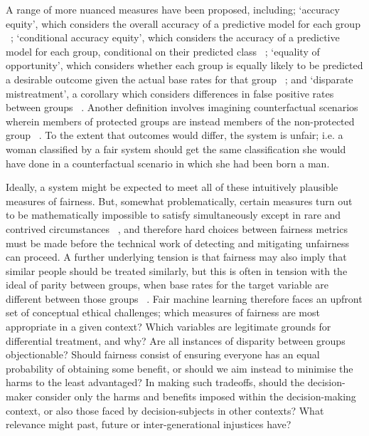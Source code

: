 \documentclass[pmlr,twocolumn,10pt]{jmlr}%
\begin{document}
A range of more nuanced measures have been proposed, including; `accuracy equity', which considers the overall accuracy of a predictive model for each group ~\cite{angwin2016machine}; `conditional accuracy equity', which considers the accuracy of a predictive model for each group, conditional on their predicted class ~\cite{dieterich2016compas}; `equality of opportunity', which considers whether each group is equally likely to be predicted a desirable outcome given the actual base rates for that group ~\cite{hardt2016equality}; and `disparate mistreatment', a corollary which considers differences in false positive rates between groups ~\cite{zafar2017fairness}. Another definition involves imagining counterfactual scenarios wherein members of protected groups are instead members of the non-protected group ~\cite{kusner2017counterfactual}. To the extent that outcomes would differ, the system is unfair; i.e. a woman classified by a fair system should get the same classification she would have done in a counterfactual scenario in which she had been born a man.

Ideally, a system might be expected to meet all of these intuitively plausible measures of fairness. But, somewhat problematically, certain measures turn out to be mathematically impossible to satisfy simultaneously except in rare and contrived circumstances ~\cite{kleinberg2016inherent}, and therefore hard choices between fairness metrics must be made before the technical work of detecting and mitigating unfairness can proceed. A further underlying tension is that fairness may also imply that similar people should be treated similarly, but this is often in tension with the ideal of parity between groups, when base rates for the target variable are different between those groups ~\cite{dwork2012fairness}. Fair machine learning therefore faces an upfront set of conceptual ethical challenges; which measures of fairness are most appropriate in a given context? Which variables are legitimate grounds for differential treatment, and why? Are all instances of disparity between groups objectionable? Should fairness consist of ensuring everyone has an equal probability of obtaining some benefit, or should we aim instead to minimise the harms to the least advantaged? In making such tradeoffs, should the decision-maker consider only the harms and benefits imposed within the decision-making context, or also those faced by decision-subjects in other contexts? What relevance might past, future or inter-generational injustices have?
\end{document}
